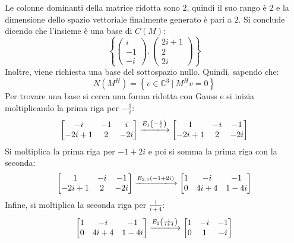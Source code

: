 \documentclass[a4paper]{article}
\makeatletter
\newenvironment{rowequmatbra}[1]{\left[\array{@{}#1@{}}}{\endarray\right]}
\makeatother
\begin{document}
	\noindent
	Le colonne dominanti della matrice ridotta sono $2$, quindi il suo rango è $2$ e la dimensione dello spazio vettoriale finalmente generato è pari a $2$. Si conclude dicendo che l'insieme è una base di $C\left(M\right)$:
	\begin{equation*}
		\left\{\begin{pmatrix}
			i \\
			-1 \\
			-i
		\end{pmatrix}, \begin{pmatrix}
			2i+1 \\
			2 \\
			2i
		\end{pmatrix}\right\}
	\end{equation*}
	Inoltre, viene richiesta una base del sottospazio nullo. Quindi, sapendo che:
	\begin{equation*}
		N\left(M^{H}\right) = \left\{v \in \mathbb{C}^{3} \: | \: M^{H}v = 0\right\}
	\end{equation*}
	Per trovare una base si cerca una forma ridotta con Gauss e si inizia moltiplicando la prima riga per $-\frac{1}{i}$:
	\begin{equation*}
		\begin{rowequmatbra}{ccc}
			-i		& -1	& i		\\
			-2i+1	&  2	& -2i
		\end{rowequmatbra}
		\xlongrightarrow{E_{1}\left(-\frac{1}{i}\right)}
		\begin{rowequmatbra}{ccc}
			1		& -i	& -1		\\
			-2i+1	&  2	& -2i
		\end{rowequmatbra}
	\end{equation*}
	Si moltiplica la prima riga per $-1+2i$ e poi si somma la prima riga con la seconda:
	\begin{equation*}
		\begin{rowequmatbra}{ccc}
			1		& -i	& -1		\\
			-2i+1	&  2	& -2i
		\end{rowequmatbra}
		\xlongrightarrow{E_{2,1}\left(-1+2i\right)}
		\begin{rowequmatbra}{ccc}
			1	& -i	& -1		\\
			0	&  4i+4	& 1-4i
		\end{rowequmatbra}
	\end{equation*}
	Infine, si moltiplica la seconda riga per $\frac{1}{i+4}$:
	\begin{equation*}
		\begin{rowequmatbra}{ccc}
			1	& -i	& -1		\\
			0	&  4i+4	& 1-4i
		\end{rowequmatbra}
		\xlongrightarrow{E_{2}\left(\frac{1}{i+4}\right)}
		\begin{rowequmatbra}{ccc}
			1	& -i	& -1		\\
			0	&  1	& -i
		\end{rowequmatbra}
	\end{equation*}
\end{document}
